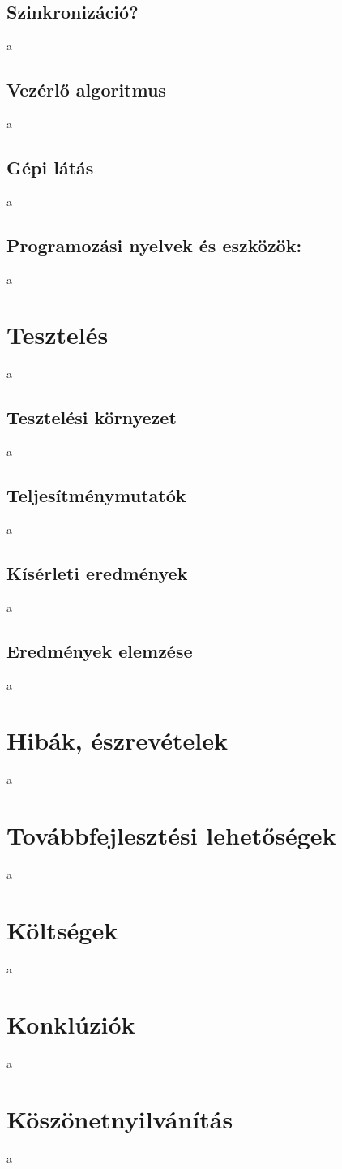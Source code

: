 \documentclass[12pt,a4paper]{article}
\begin{document}
\subsection{Szinkronizáció?}
a
\subsection{Vezérlő algoritmus}
a
\subsection{Gépi látás}
a
\subsection{Programozási nyelvek és eszközök:}
a
\section{Tesztelés}
a
\subsection{Tesztelési környezet}
a
\subsection{Teljesítménymutatók}
a
\subsection{Kísérleti eredmények}
a
\subsection{Eredmények elemzése}
a
\section{Hibák, észrevételek}
a
\section{Továbbfejlesztési lehetőségek}
a
\section{Költségek}
a
\section{Konklúziók}
a
\section{Köszönetnyilvánítás}
a
\end{document}
